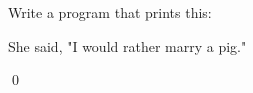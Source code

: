 Write a program that prints this:

\begin{console}

She said, "I would rather marry a pig."

\end{console}

\qed

